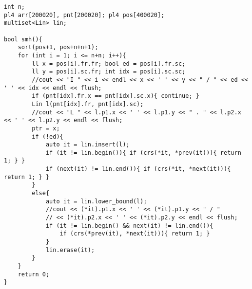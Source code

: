 \documentclass[landscape, 8pt, a4paper, oneside, twocolumn]{extarticle}
\begin{document}
\begin{verbatim}
int n;
pl4 arr[200020], pnt[200020]; pl4 pos[400020];
multiset<Lin> lin;

bool smh(){
	sort(pos+1, pos+n+n+1);
	for (int i = 1; i <= n+n; i++){
		ll x = pos[i].fr.fr; bool ed = pos[i].fr.sc;
		ll y = pos[i].sc.fr; int idx = pos[i].sc.sc;
		//cout << "I " << i << endl << x << ' ' << y << " / " << ed << ' ' << idx << endl << flush;
		if (pnt[idx].fr.x == pnt[idx].sc.x){ continue; }
		Lin l(pnt[idx].fr, pnt[idx].sc);
		//cout << "L " << l.p1.x << ' ' << l.p1.y << " . " << l.p2.x << ' ' << l.p2.y << endl << flush;
		ptr = x;
		if (!ed){
			auto it = lin.insert(l);
			if (it != lin.begin()){ if (crs(*it, *prev(it))){ return 1; } }
			if (next(it) != lin.end()){ if (crs(*it, *next(it))){ return 1; } }
		}
		else{
			auto it = lin.lower_bound(l);
			//cout << (*it).p1.x << ' ' << (*it).p1.y << " / "
			// << (*it).p2.x << ' ' << (*it).p2.y << endl << flush;
			if (it != lin.begin() && next(it) != lin.end()){
				if (crs(*prev(it), *next(it))){ return 1; }
			}
			lin.erase(it);
		}
	}
	return 0;
}
\end{verbatim}
\end{document}
